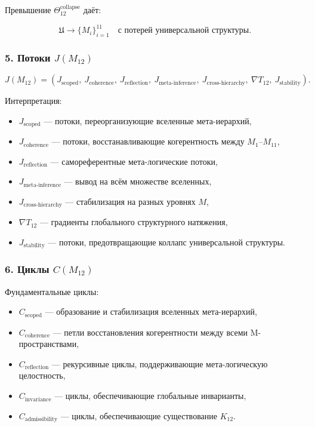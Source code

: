 Превышение $\Theta_{12}^{\mathrm{collapse}}$ даёт:

\[
\mathfrak{U} \to \{ M_i \}_{i=1}^{11}
\quad\text{с потерей универсальной структуры}.
\]

\subsubsection*{5. Потоки $J(M_{12})$}

\[
J(M_{12})=
(
J_{\mathrm{scoped}},\
J_{\mathrm{coherence}},\
J_{\mathrm{reflection}},\
J_{\mathrm{meta\mbox{-}inference}},\
J_{\mathrm{cross\mbox{-}hierarchy}},\
\nabla T_{12},\
J_{\mathrm{stability}}
).
\]

Интерпретация:

\begin{itemize}
    \item $J_{\mathrm{scoped}}$ — потоки, переорганизующие вселенные мета-иерархий,
    \item $J_{\mathrm{coherence}}$ — потоки, восстанавливающие когерентность между $M_1$–$M_{11}$,
    \item $J_{\mathrm{reflection}}$ — самореферентные мета-логические потоки,
    \item $J_{\mathrm{meta\mbox{-}inference}}$ — вывод на всём множестве вселенных,
    \item $J_{\mathrm{cross\mbox{-}hierarchy}}$ — стабилизация на разных уровнях $M$,
    \item $\nabla T_{12}$ — градиенты глобального структурного натяжения,
    \item $J_{\mathrm{stability}}$ — потоки, предотвращающие коллапс универсальной структуры.
\end{itemize}

\subsubsection*{6. Циклы $C(M_{12})$}

Фундаментальные циклы:

\begin{itemize}
    \item $C_{\mathrm{scoped}}$ — образование и стабилизация вселенных мета-иерархий,
    \item $C_{\mathrm{coherence}}$ — петли восстановления когерентности между всеми M-пространствами,
    \item $C_{\mathrm{reflection}}$ — рекурсивные циклы, поддерживающие мета-логическую целостность,
    \item $C_{\mathrm{invariance}}$ — циклы, обеспечивающие глобальные инварианты,
    \item $C_{\mathrm{admissibility}}$ — циклы, обеспечивающие существование $K_{12}$.
\end{itemize}

